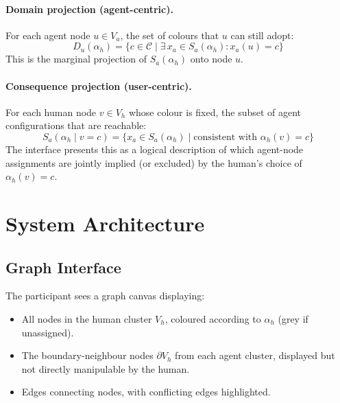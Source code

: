 \documentclass[10pt]{article}
\theoremstyle{definition}
\begin{document}
\paragraph{Domain projection (agent-centric).}
For each agent node $u \in V_a$, the set of colours that $u$ can still adopt:
\begin{equation}
  D_u(\alpha_h) = \bigl\{ c \in \mathcal{C} \;\big|\;
    \exists\, x_a \in S_a(\alpha_h): x_a(u) = c \bigr\}
  \label{eq:domain}
\end{equation}
This is the marginal projection of $S_a(\alpha_h)$ onto node $u$.

\paragraph{Consequence projection (user-centric).}
For each human node $v \in V_h$ whose colour is fixed, the subset of agent configurations
that are reachable:
\begin{equation}
  S_a(\alpha_h \mid v = c) = \bigl\{ x_a \in S_a(\alpha_h)
    \;\big|\; \text{consistent with } \alpha_h(v) = c \bigr\}
  \label{eq:consequence}
\end{equation}
The interface presents this as a logical description of which agent-node assignments are
jointly implied (or excluded) by the human's choice of $\alpha_h(v) = c$.

\section{System Architecture}
\label{sec:system}

\subsection{Graph Interface}

The participant sees a graph canvas displaying:
\begin{itemize}
  \item All nodes in the human cluster $V_h$, coloured according to $\alpha_h$ (grey if
        unassigned).
  \item The boundary-neighbour nodes $\partial V_h$ from each agent cluster, displayed but
        not directly manipulable by the human.
  \item Edges connecting nodes, with conflicting edges highlighted.
\end{itemize}
\end{document}
